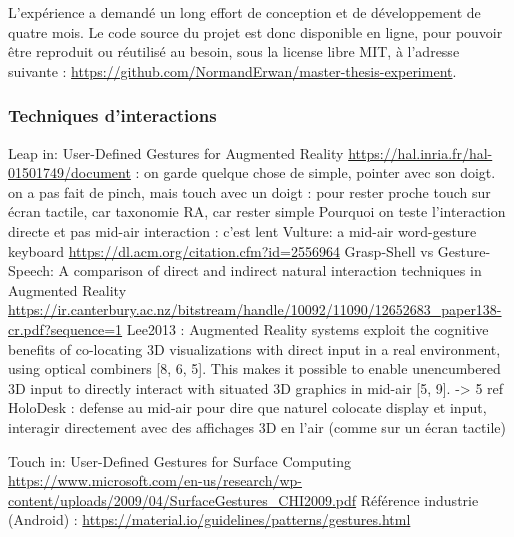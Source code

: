 L'expérience a demandé un long effort de conception et de développement de quatre mois. Le code source du projet est donc disponible en ligne, pour pouvoir être reproduit ou réutilisé au besoin, sous la license libre MIT, à l'adresse suivante : \url{https://github.com/NormandErwan/master-thesis-experiment}.

\subsubsection{Techniques d'interactions}
Leap in:
User-Defined Gestures for Augmented Reality \url{https://hal.inria.fr/hal-01501749/document} : on garde quelque chose de simple, pointer avec son doigt. on a pas fait de pinch, mais touch avec un doigt : pour rester proche touch sur écran tactile, car taxonomie RA, car rester simple
Pourquoi on teste l'interaction directe et pas mid-air interaction : c'est lent Vulture: a mid-air word-gesture keyboard \url{https://dl.acm.org/citation.cfm?id=2556964}
Grasp-Shell vs Gesture-Speech: A comparison of direct and indirect natural interaction
techniques in Augmented Reality \url{https://ir.canterbury.ac.nz/bitstream/handle/10092/11090/12652683_paper138-cr.pdf?sequence=1}
Lee2013 : Augmented Reality systems exploit the cognitive benefits of co-locating 3D visualizations with direct input in a real environment, using optical combiners [8, 6, 5]. This makes it possible to enable unencumbered 3D input to directly interact with situated 3D graphics in mid-air [5, 9]. -> 5 ref HoloDesk : defense au mid-air pour dire que naturel colocate display et input, interagir directement avec des affichages 3D en l'air (comme sur un écran tactile)

Touch in:
User-Defined Gestures for Surface Computing \url{https://www.microsoft.com/en-us/research/wp-content/uploads/2009/04/SurfaceGestures_CHI2009.pdf}
Référence industrie (Android) : \url{https://material.io/guidelines/patterns/gestures.html}


